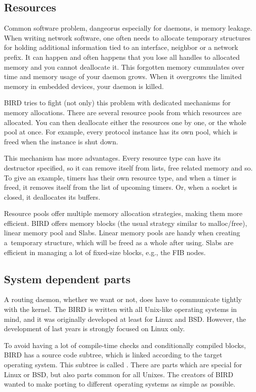 \subsection{Resources}
Common software problem, dangeorus especially for daemons, is memory leakage.
When writing network software, one often needs to allocate temporary structures
for holding additional information tied to an interface, neighbor or a network
prefix. It can happen and often happens that you lose all handles to allocated
memory and you cannot deallocate it. This forgotten memory cummulates over time
and memory usage of your daemon grows. When it overgrows the limited memory
in embedded devices, your daemon is killed.

BIRD tries to fight (not only) this problem with dedicated mechanisms for
memory allocations. There are several resource pools from which resources are
allocated. You can then deallocate either the resources one by one, or the
whole pool at once. For example, every protocol instance has its own pool,
which is freed when the instance is shut down.

This mechanism has more advantages. Every resource type can have its destructor
specified, so it can remove itself from lists, free related memory and so. To
give an example, timers has their own resource type, and when a timer is freed,
it removes itself from the list of upcoming timers. Or, when a socket is
closed, it deallocates its buffers.

Resource pools offer multiple memory allocation strategies, making them more
efficient. BIRD offers memory blocks (the usual strategy similar to
malloc/free), linear memory pool and Slabs. Linear memory pools are handy when
creating a~temporary structure, which will be freed as a whole after using.
Slabs are efficient in managing a lot of fixed-size blocks, e.g., the FIB nodes.

\subsection{System dependent parts}
A routing daemon, whether we want or not, does have to communicate tightly with
the kernel. The BIRD is written with all Unix-like operating systems in mind,
and it was originally developed at least for Linux and BSD. However, the
development of last years is strongly focused on Linux only.

To avoid having a lot of compile-time checks and conditionally compiled blocks,
BIRD has a source code subtree, which is linked according to the target
operating system. This subtree is called . There are parts which
are special for Linux or BSD, but also parts common for all Unixes. The
creators of BIRD wanted to make porting to different operating systems as
simple as possible.

